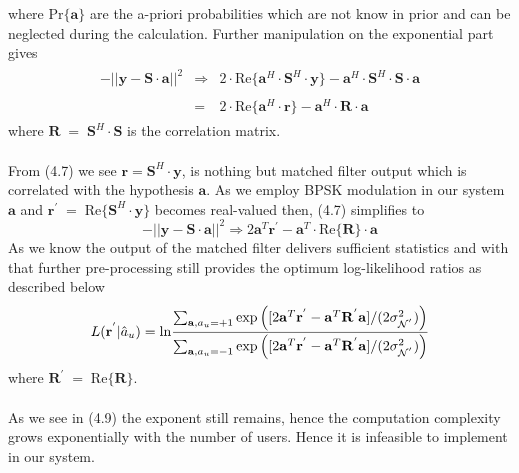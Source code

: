 where $\mathrm{Pr}\{\mathrm{\mathbf{a}}\}$ are the a-priori probabilities which are not know in prior and can be neglected during the calculation. Further manipulation on the exponential part gives 
\begin{eqnarray}
\begin{array}{lll}
-\vert\vert\mathrm{\mathbf{y}}-\mathrm{\mathbf{S}}\cdot\mathrm{\mathbf{a}}\vert\vert ^2&\Rightarrow&2\cdot\mathrm{Re}\{\mathrm{\mathbf{a}}^H\cdot\mathrm{\mathbf{S}}^H\cdot\mathrm{\mathbf{y}}\}-\mathrm{\mathbf{a}}^H\cdot\mathrm{\mathbf{S}}^H\cdot\mathrm{\mathbf{S}}\cdot\mathrm{\mathbf{a}}\\\\
&=&2\cdot \mathrm{Re}\{\mathrm{\mathbf{a}}^H\cdot\mathrm{\mathbf{r}}\}-\mathrm{\mathbf{a}}^H \cdot \mathrm{\mathbf{R}}\cdot \mathrm{\mathbf{a}}
\end{array}
\end{eqnarray}
where $\mathrm{\mathbf{R}}\;=\;\mathrm{\mathbf{S}}^H\cdot\mathrm{\mathbf{S}}$ is the correlation matrix.\\ \\
From (4.7) we see $\mathrm{\mathbf{r}}=\mathrm{\mathbf{S}}^H\cdot\mathrm{\mathbf{y}}$, is nothing but matched filter output which is correlated with the hypothesis $\mathrm{\mathbf{a}}$. As we employ BPSK modulation in our system $\mathrm{\mathbf{a}}$ and $\mathrm{\mathbf{r}}^{'}\;=\;\mathrm{Re}\{\mathrm{\mathbf{S}}^H\cdot \mathrm{\mathbf{y}}\}$ becomes real-valued then, (4.7) simplifies to
\begin{equation}
-\vert\vert\mathrm{\mathbf{y}}-\mathrm{\mathbf{S}}\cdot\mathrm{\mathbf{a}}\vert\vert ^2 \Longrightarrow 2\mathrm{\mathbf{a}}^T\mathrm{\mathbf{r}}^{'}-\mathrm{\mathbf{a}}^T\cdot \mathrm{Re}\{\mathrm{\mathbf{R}}\}\cdot \mathrm{\mathbf{a}}
\end{equation}
As we know the output of the matched filter delivers sufficient statistics and with that further pre-processing still provides the optimum log-likelihood ratios as described below
\begin{equation}
L(\mathrm{\mathbf{r}}^{'}\vert \hat{a}_u)=\mathrm{ln}\frac{\hbox{$\sum_{\mathrm{\mathbf{a}},a_u=+1}\mathrm{exp}\left([2\mathrm{\mathbf{a}}^T\mathrm{\mathbf{r}}^{'}-\mathrm{\mathbf{a}}^T\mathrm{\mathbf{R}}^{'}\mathrm{\mathbf{a}}]/(2\sigma^2_{\mathcal{N}^{'}})\right)$}}{\hbox{$\sum_{\mathrm{\mathbf{a}},a_u=-1}\mathrm{exp}\left([2\mathrm{\mathbf{a}}^T\mathrm{\mathbf{r}}^{'}-\mathrm{\mathbf{a}}^T\mathrm{\mathbf{R}}^{'}\mathrm{\mathbf{a}}]/(2\sigma^2_{\mathcal{N}^{'}})\right)$}}
\end{equation}
where $\mathrm{\mathbf{R}}^{'}\;=\;\mathrm{Re}\{\mathrm{\mathbf{R}}\}$. \\ \\
As we see in (4.9) the exponent still remains, hence the computation complexity grows exponentially with the number of users. Hence it is infeasible to implement in our system. 
